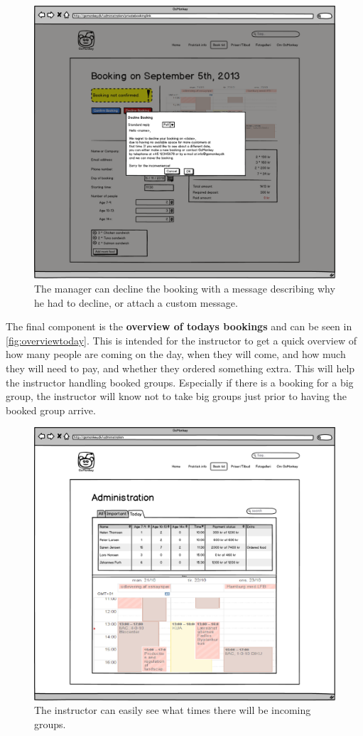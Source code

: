 \begin{figure}[htbp]
    \centering
        \includegraphics[width=.8\textwidth]{figures/mockup/admin_booking_decline.png}
	    \caption{The manager can decline the booking with a message describing why he had to decline, or attach a custom message.}
        \label{fig:admindecline}
\end{figure}

The final component is the \textbf{overview of todays bookings} and can be seen in
\autoref{fig:overviewtoday}. This is intended for 
the instructor to get a quick overview of how many people are coming on the 
day, when they will come, and how much they will need to pay, and whether
they ordered something extra. This will help the instructor handling booked 
groups. Especially if there is a booking for a big group, the instructor will
know not to take big groups just prior to having the booked group arrive.

\begin{figure}[htbp]
    \centering
        \includegraphics[width=.8\textwidth]{figures/mockup/overview_today.png}
	    \caption{The instructor can easily see what times there will be incoming groups.}
        \label{fig:overviewtoday}
\end{figure}


